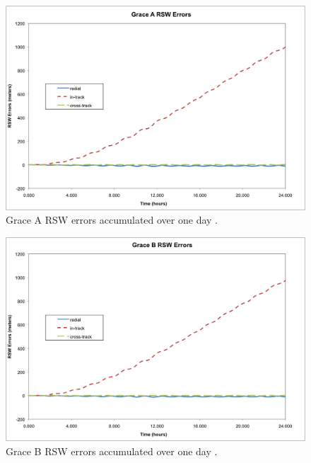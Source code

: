 \begin{description}
\begin{figure}
\begin{center}
\includegraphics [width=7.0in]{figs/grace/gracea_err.png}
\end{center}
\caption{Grace A RSW errors accumulated over one day .}
\label{fig:7}
\end{figure}

\begin{figure}
\begin{center}
\includegraphics [width=7.0in]{figs/grace/graceb_err.png}
\end{center}
\caption{Grace B RSW errors accumulated over one day .}
\label{fig:8}
\end{figure}

\end{description}
\clearpage
\newpage

